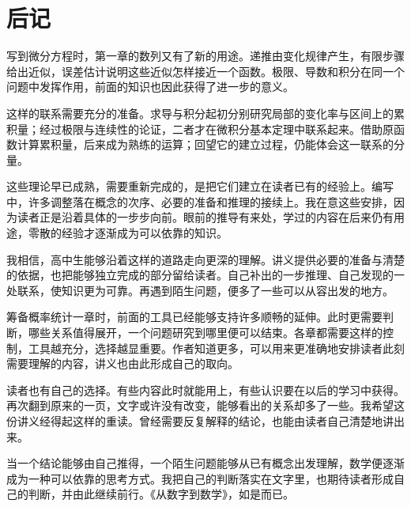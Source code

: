 \chapter*{后记}

写到微分方程时，第一章的数列又有了新的用途。递推由变化规律产生，有限步骤给出近似，误差估计说明这些近似怎样接近一个函数。极限、导数和积分在同一个问题中发挥作用，前面的知识也因此获得了进一步的意义。

这样的联系需要充分的准备。求导与积分起初分别研究局部的变化率与区间上的累积量；经过极限与连续性的论证，二者才在微积分基本定理中联系起来。借助原函数计算累积量，后来成为熟练的运算；回望它的建立过程，仍能体会这一联系的分量。

这些理论早已成熟，需要重新完成的，是把它们建立在读者已有的经验上。编写中，许多调整落在概念的次序、必要的准备和推理的接续上。我在意这些安排，因为读者正是沿着具体的一步步向前。眼前的推导有来处，学过的内容在后来仍有用途，零散的经验才逐渐成为可以依靠的知识。

我相信，高中生能够沿着这样的道路走向更深的理解。讲义提供必要的准备与清楚的依据，也把能够独立完成的部分留给读者。自己补出的一步推理、自己发现的一处联系，使知识更为可靠。再遇到陌生问题，便多了一些可以从容出发的地方。

筹备概率统计一章时，前面的工具已经能够支持许多顺畅的延伸。此时更需要判断，哪些关系值得展开，一个问题研究到哪里便可以结束。各章都需要这样的控制，工具越充分，选择越显重要。作者知道更多，可以用来更准确地安排读者此刻需要理解的内容，讲义也由此形成自己的取向。

读者也有自己的选择。有些内容此时就能用上，有些认识要在以后的学习中获得。再次翻到原来的一页，文字或许没有改变，能够看出的关系却多了一些。我希望这份讲义经得起这样的重读。曾经需要反复解释的结论，也能由读者自己清楚地讲出来。

当一个结论能够由自己推得，一个陌生问题能够从已有概念出发理解，数学便逐渐成为一种可以依靠的思考方式。我把自己的判断落实在文字里，也期待读者形成自己的判断，并由此继续前行。《从数字到数学》，如是而已。

\begin{flushright}
\lecturenotesdate
\end{flushright}
